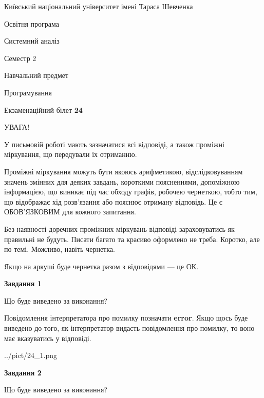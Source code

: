 \documentclass[12pt, ukrainian]{article}
\begin{document}
{{\begin {small}\par
{ \center  Київський національний університет імені Тараса Шевченка \par}
{\parbox {5 cm}{Освітня програма \hfill}{\parbox {7 cm}{Системний аналіз \hfill}}\parbox {6 cm}{\hfill Семестр 2}}\par
{\parbox {5 cm} {Навчальний предмет \hfill}\parbox {7 cm}{Програмування \hfill}\parbox {6cm}{\hfill}\par}\vspace{-7pt} \end{small}}{\center Екзаменаційний білет \No \textbf
{ 24 }\par}}
{
\begin {large}
УВАГА!

У письмовій роботі мають зазначатися всі відповіді, а також проміжні міркування, що передували їх отриманню.

Проміжні міркування можуть бути якоюсь арифметикою, відслідковуванням зна\-чень змінних для деяких завдань,
короткими поясненнями, допоміжною інформацією, що виникає під час обходу графів, робочею чернеткою,
тобто тим, що відображає хід розв’язання або пояснює отриману відповідь.
Це є ОБОВ’ЯЗКОВИМ для кожного запитання.

Без наявності доречних проміжних міркувань відповіді зараховуватись як правиль\-ні не будуть.
Писати багато та красиво оформлено не треба. Коротко, але по темі. Можли\-во, навіть чернетка.

Якщо на аркуші буде чернетка разом з відповідями --- це ОК.

\newpage

{\begin {center}\textbf{Завдання 1}\end {center}}\par
Що буде виведено за виконання?

Повідомлення інтерпретатора про помилку позначати \textbf{error}.
Якщо щось буде виведено до того, як інтерпретатор видасть повідомлення про помилку, 
то воно має вказуватись у відповіді. \par


\begin{center}
	{../pict/24_1.png}
\end{center}
\newpage

{\begin {center}\textbf{Завдання 2}\end {center}}\par
Що буде виведено за виконання?


\end{large}}
\end{document}
